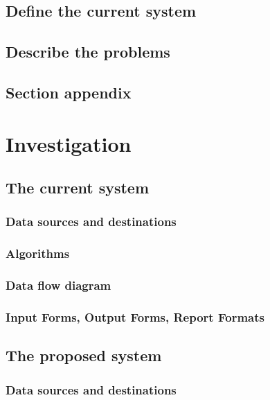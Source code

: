 \subsection{Define the current system}

\subsection{Describe the problems}

\subsection{Section appendix}

\section{Investigation}

\subsection{The current system}

\subsubsection{Data sources and destinations}

\subsubsection{Algorithms}

\subsubsection{Data flow diagram}

\subsubsection{Input Forms, Output Forms, Report Formats}

\subsection{The proposed system}

\subsubsection{Data sources and destinations}

